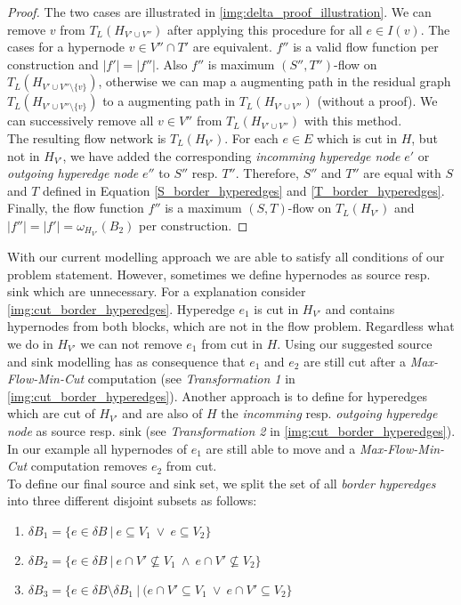 \begin{proof}
The two cases are illustrated in \autoref{img:delta_proof_illustration}.
We can remove $v$ from $T_L(H_{V' \cup V''})$ after applying this procedure for 
all $e \in I(v)$. The cases for a hypernode $v \in V'' \cap T'$ are equivalent. 
$f''$ is a valid flow function per construction and $|f'| = |f''|$. Also $f''$
is maximum $(S'',T'')$-flow on $T_L(H_{V' \cup V''\setminus \{v\}})$, otherwise
we can map a augmenting path in the residual graph $T_L(H_{V' \cup V''\setminus \{v\}})$
to a augmenting path in $T_L(H_{V' \cup V''})$ (without a proof). We can successively
remove all $v \in V''$ from $T_L(H_{V' \cup V''})$ with this method. \\
The resulting  flow network is $T_L(H_{V'})$. For each $e \in E$ which is cut in $H$, but not
in $H_{V'}$, we have added the corresponding \emph{incomming hyperedge node} $e'$
or \emph{outgoing hyperedge node} $e''$ to $S''$ resp. $T''$. Therefore, 
$S''$ and $T''$ are equal with $S$ and $T$ defined in Equation \ref{S_border_hyperedges}
and \ref{T_border_hyperedges}. Finally, the flow function $f''$ is a maximum
$(S,T)$-flow on $T_L(H_{V'})$ and $|f''| = |f'| = \omega_{H_{V'}}(B_2)$ per construction.
\end{proof}

With our current modelling approach we are able to satisfy all conditions of
our problem statement. However, sometimes we define hypernodes as source resp.
sink which are unnecessary. For a explanation consider \autoref{img:cut_border_hyperedges}.
Hyperedge $e_1$ is cut in $H_{V'}$ and contains hypernodes from both
blocks, which are not in the flow problem. Regardless what we do in $H_{V'}$
we can not remove $e_1$ from cut in $H$. Using our suggested source and sink modelling has
as consequence that $e_1$ and $e_2$ are still cut after a \emph{Max-Flow-Min-Cut} 
computation (see \emph{Transformation 1} in \autoref{img:cut_border_hyperedges}). Another approach
is to define for hyperedges which are cut of $H_{V'}$ and are also of $H$ the \emph{incomming}
resp. \emph{outgoing hyperedge node} as source resp. sink (see \emph{Transformation 2} in
\autoref{img:cut_border_hyperedges}). In our example all hypernodes of $e_1$ are still able 
to move and a \emph{Max-Flow-Min-Cut} computation removes $e_2$ from cut.\\
To define our final source and sink set, we split the set of all \emph{border hyperedges} into
three different disjoint subsets as follows:

\begin{enumerate}
\item $\delta B_1 = \{ e \in \delta B \ |\ e \subseteq V_1\ \lor\ e \subseteq V_2 \}$
\item $\delta B_2 = \{ e \in \delta B \ |\ e \cap V' \not\subseteq V_1\ \land\ e \cap V' \not\subseteq V_2\}$
\item $\delta B_3 = \{ e \in \delta B \setminus \delta B_1 \ |\ (e \cap V' \subseteq V_1\ \lor\ e \cap V' \subseteq V_2 \}$
\end{enumerate}

